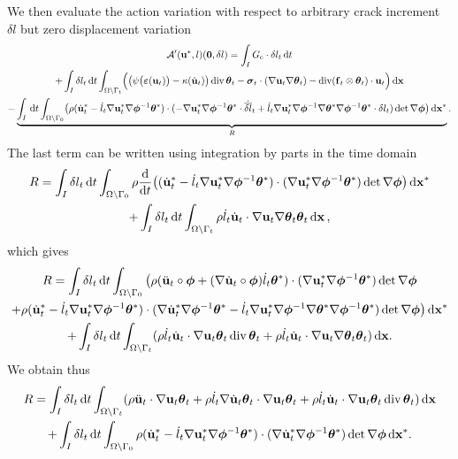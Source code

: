 We then evaluate the action variation with respect to arbitrary crack increment $\delta l$ but zero displacement variation
\begin{multline} \label{eq:aprime3}
\mathcal{A}'(\vec{u}^*,l)(\vec{0},\delta l)=\int_I\gc\cdot\delta l_t\D{t} \\
+\int_I\delta l_t\D{t}\int_\domaint\Bigl(\bigl(\psi\bigl(\eps(\vec{u}_t)\bigr)-\kappa(\dot{\vec{u}}_t)\bigr)\div\vtheta_t-\sig_t\cdot(\nabla\vec{u}_t\nabla\vtheta_t)-\div(\vec{f}_t\otimes\vtheta_t)\cdot\vec{u}_t\Bigr)\dx \\
-\underbrace{\int_I\D{t}\int_\domaini\bigl(\rho(\dot{\vec{u}}^*_t-\dot{l}_t\nabla\vec{u}^*_t\nabla\philt^{-1}\vtheta^*)\cdot(-\nabla\vec{u}_t^*\nabla\philt^{-1}\vtheta^*\cdot\dot{\overline{\delta l}}_t+\dot{l}_t\nabla\vec{u}_t^*\nabla\philt^{-1}\nabla\vtheta^*\nabla\philt^{-1}\vtheta^*\cdot\delta l_t)\det\nabla\philt\bigr)\dxx}_R.
\end{multline}
The last term can be written using integration by parts in the time domain
\begin{multline*}
R=\int_I\delta l_t\D{t}\int_\domaini\rho\frac{\md}{\md t}\bigl((\dot{\vec{u}}^*_t-\dot{l}_t\nabla\vec{u}^*_t\nabla\philt^{-1}\vtheta^*)\cdot(\nabla\vec{u}_t^*\nabla\philt^{-1}\vtheta^*)\det\nabla\philt\bigr)\dxx \\
+\int_I\delta l_t\D{t}\int_\domaint\rho\dot{l}_t\dot{\vec{u}}_t\cdot\nabla\vec{u}_t\nabla\vtheta_t\vtheta_t\dx\,,
\end{multline*}
which gives
\begin{multline*}
R=\int_I\delta l_t\D{t}\int_\domaini\big(\rho(\ddot{\vec{u}}_t\circ\philt+(\nabla\dot{\vec{u}}_t\circ\philt)\dot{l}_t\vtheta^*)\cdot(\nabla\vec{u}_t^*\nabla\philt^{-1}\vtheta^*)\det\nabla\philt \\
+\rho(\dot{\vec{u}}^*_t-\dot{l}_t\nabla\vec{u}^*_t\nabla\philt^{-1}\vtheta^*)\cdot(\nabla\dot{\vec{u}}^*_t\nabla\philt^{-1}\vtheta^*-\dot{l}_t\nabla\vec{u}^*_t\nabla\philt^{-1}\nabla\vtheta^*\nabla\philt^{-1}\vtheta^*)\det\nabla\philt\big)\dxx \\
+\int_I\delta l_t\D{t}\int_\domaint(\rho\dot{l}_t\dot{\vec{u}}_t\cdot\nabla\vec{u}_t\vtheta_t\div\vtheta_t+\rho\dot{l}_t\dot{\vec{u}}_t\cdot\nabla\vec{u}_t\nabla\vtheta_t\vtheta_t)\dx.
\end{multline*}
We obtain thus
\begin{multline*}
R=\int_I\delta l_t\D{t}\int_\domaint(\rho\ddot{\vec{u}}_t\cdot\nabla\vec{u}_t\vtheta_t+\rho\dot{l}_t\nabla\dot{\vec{u}}_t\vtheta_t\cdot\nabla\vec{u}_t\vtheta_t+\rho\dot{l}_t\dot{\vec{u}}_t\cdot\nabla\vec{u}_t\vtheta_t\div\vtheta_t)\dx \\
+\int_I\delta l_t\D{t}\int_\domaini\rho(\dot{\vec{u}}^*_t-\dot{l}_t\nabla\vec{u}^*_t\nabla\philt^{-1}\vtheta^*)\cdot(\nabla\dot{\vec{u}}^*_t\nabla\philt^{-1}\vtheta^*)\det\nabla\philt\dxx.
\end{multline*}
